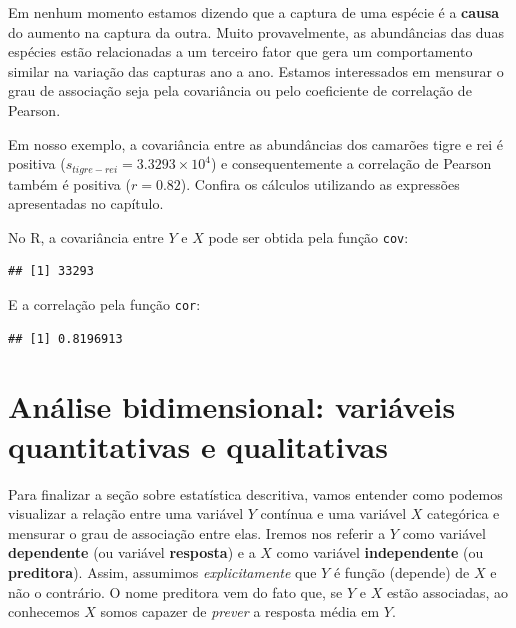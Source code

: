 \documentclass[
]{book}
\newenvironment{Shaded}{\begin{snugshade}}{\end{snugshade}}
\newcommand{\FunctionTok}[1]{\textcolor[rgb]{0.00,0.00,0.00}{#1}}
\newcommand{\NormalTok}[1]{#1}
\newcommand{\SpecialCharTok}[1]{\textcolor[rgb]{0.00,0.00,0.00}{#1}}
\begin{document}
Em nenhum momento estamos dizendo que a captura de uma espécie é a \textbf{causa} do aumento na captura da outra. Muito provavelmente, as abundâncias das duas espécies estão relacionadas a um terceiro fator que gera um comportamento similar na variação das capturas ano a ano. Estamos interessados em mensurar o grau de associação seja pela covariância ou pelo coeficiente de correlação de Pearson.

Em nosso exemplo, a covariância entre as abundâncias dos camarões tigre e rei é positiva (\(s_{tigre-rei} = \ensuremath{3.3293\times 10^{4}}\)) e consequentemente a correlação de Pearson também é positiva (\(r = 0.82\)). Confira os cálculos utilizando as expressões apresentadas no capítulo.

No R, a covariância entre \(Y\) e \(X\) pode ser obtida pela função \texttt{cov}:

\begin{Shaded}
\end{Shaded}

\begin{verbatim}
## [1] 33293
\end{verbatim}

E a correlação pela função \texttt{cor}:

\begin{Shaded}
\end{Shaded}

\begin{verbatim}
## [1] 0.8196913
\end{verbatim}

\hypertarget{biquantquali}{%
\chapter{Análise bidimensional: variáveis quantitativas e qualitativas}\label{biquantquali}}

Para finalizar a seção sobre estatística descritiva, vamos entender como podemos visualizar a relação entre uma variável \(Y\) contínua e uma variável \(X\) categórica e mensurar o grau de associação entre elas. Iremos nos referir a \(Y\) como variável \textbf{dependente} (ou variável \textbf{resposta}) e a \(X\) como variável \textbf{independente} (ou \textbf{preditora}). Assim, assumimos \emph{explicitamente} que \(Y\) é função (depende) de \(X\) e não o contrário. O nome preditora vem do fato que, se \(Y\) e \(X\) estão associadas, ao conhecemos \(X\) somos capazer de \emph{prever} a resposta média em \(Y\).
\end{document}
